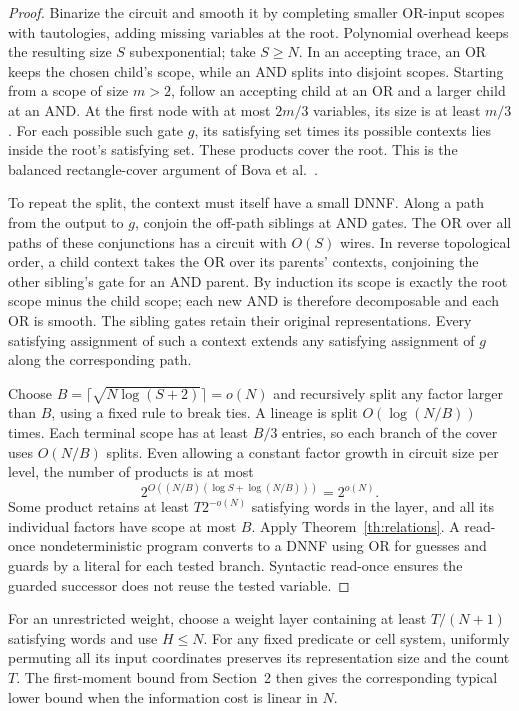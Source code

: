 \begin{proof}
Binarize the circuit and smooth it by completing smaller OR-input scopes with tautologies, adding missing variables at the root. Polynomial overhead keeps the resulting size $S$ subexponential; take $S\ge N$. In an accepting trace, an OR keeps the chosen child's scope, while an AND splits into disjoint scopes. Starting from a scope of size $m>2$, follow an accepting child at an OR and a larger child at an AND. At the first node with at most $2m/3$ variables, its size is at least $m/3$. For each possible such gate $g$, its satisfying set times its possible contexts lies inside the root's satisfying set. These products cover the root. This is the balanced rectangle-cover argument of Bova et al.\ \cite{b}.

To repeat the split, the context must itself have a small DNNF. Along a path from the output to $g$, conjoin the off-path siblings at AND gates. The OR over all paths of these conjunctions has a circuit with $O(S)$ wires. In reverse topological order, a child context takes the OR over its parents' contexts, conjoining the other sibling's gate for an AND parent. By induction its scope is exactly the root scope minus the child scope; each new AND is therefore decomposable and each OR is smooth. The sibling gates retain their original representations. Every satisfying assignment of such a context extends any satisfying assignment of $g$ along the corresponding path.

Choose $B=\lceil\sqrt{N\log(S+2)}\rceil=o(N)$ and recursively split any factor larger than $B$, using a fixed rule to break ties. A lineage is split $O(\log(N/B))$ times. Each terminal scope has at least $B/3$ entries, so each branch of the cover uses $O(N/B)$ splits. Even allowing a constant factor growth in circuit size per level, the number of products is at most
\[
  2^{O((N/B)(\log S+\log(N/B)))}=2^{o(N)}.
\]
Some product retains at least $T2^{-o(N)}$ satisfying words in the layer, and all its individual factors have scope at most $B$. Apply Theorem~\ref{th:relations}. A read-once nondeterministic program converts to a DNNF using OR for guesses and guards by a literal for each tested branch. Syntactic read-once ensures the guarded successor does not reuse the tested variable.
\end{proof}
For an unrestricted weight, choose a weight layer containing at least $T/(N+1)$ satisfying words and use $H\le N$. For any fixed predicate or cell system, uniformly permuting all its input coordinates preserves its representation size and the count $T$. The first-moment bound from Section~2 then gives the corresponding typical lower bound when the information cost is linear in $N$.
